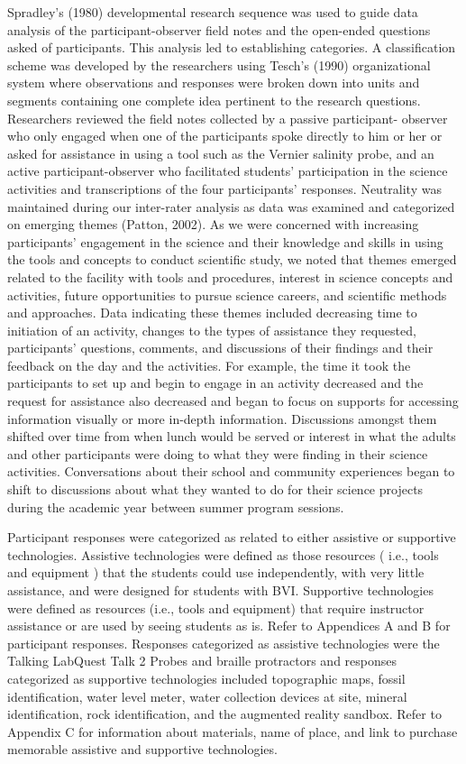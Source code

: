 \documentclass[11.5pt]{sig-alternate}
\begin{document}
\begin{large}
Spradley’s (1980) developmental research sequence was used to guide data analysis of the participant-observer field notes and the open-ended questions asked of participants. This analysis led to establishing categories. A classification scheme was developed by the researchers using Tesch’s (1990) organizational system where observations and responses were broken down into units and segments containing one complete idea pertinent to the research questions. Researchers reviewed the field notes collected by a passive participant- observer who only engaged when one of the participants spoke directly to him or her or asked for assistance in using a tool such as the Vernier salinity probe, and an active participant-observer who facilitated students’ participation in the science activities and transcriptions of the four participants’ responses. Neutrality was maintained during our inter-rater analysis as data was examined and categorized on emerging themes (Patton, 2002). As we were concerned with increasing participants’ engagement in the science and their knowledge and skills in using the tools and concepts to conduct scientific study, we noted that themes emerged related to the facility with tools and procedures, interest in science concepts and activities, future opportunities to pursue science careers, and scientific methods and approaches. Data indicating these themes included decreasing time to initiation of an activity, changes to the types of assistance they requested, participants’ questions, comments, and discussions of their findings and their feedback on the day and the activities. For example, the time it took the participants to set up and begin to engage in an activity decreased and the request for assistance also decreased and began to focus on supports for accessing information visually or more in-depth information. Discussions amongst them shifted over time from when lunch would be served or interest in what the adults and other participants were doing to what they were finding in their science activities. Conversations about their school and community experiences began to shift to discussions about what they wanted to do for their science projects during the academic year between summer program sessions.

Participant responses were categorized as related to either assistive or supportive technologies. Assistive technologies were defined as those resources ( i.e., tools and equipment ) that the students could use independently, with very little assistance, and were designed for students with BVI. Supportive technologies were defined as resources (i.e., tools and equipment) that require instructor assistance or are used by seeing students as is. Refer to Appendices A and B for participant responses. Responses categorized as assistive technologies were the Talking LabQuest Talk 2 Probes and braille protractors and responses categorized as supportive technologies included topographic maps, fossil identification, water level meter, water collection devices at site, mineral identification, rock identification, and the augmented reality sandbox. Refer to Appendix C for information about materials, name of place, and link to purchase memorable assistive and supportive technologies.

\end{large}
\end{document}

